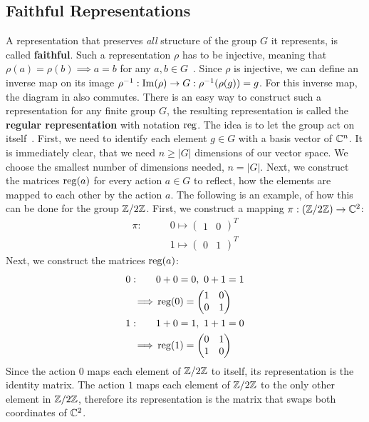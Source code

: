 \subsection{Faithful Representations}
\label{sec:basics.rep.faith}

A representation that preserves \textit{all} structure of the group $G$ it represents, is called \textbf{faithful}.
Such a representation $\rho$ has to be injective, meaning that $\rho(a) = \rho(b) \implies a = b$ for any $a, b \in G$~\cite{hein2013}.
Since $\rho$ is injective, we can define an inverse map on its image $\rho^{-1}: \operatorname{Im}(\rho) \to G: \rho^{-1}(\rho(g)) = g$.
For this inverse map, the diagram in  also commutes.
There is an easy way to construct such a representation for any finite group $G$, the resulting representation is called the \textbf{regular representation} with notation $\operatorname{reg}$.
The idea is to let the group act on itself~\cite{fulton2013}.
First, we need to identify each element $g \in G$ with a basis vector of $\mathbb{C}^n$.
It is immediately clear, that we need $n \geq |G|$ dimensions of our vector space.
We choose the smallest number of dimensions needed, $n = |G|$.
Next, we construct the matrices $\operatorname{reg}(a)$ for every action $a \in G$ to reflect, how the elements are mapped to each other by the action $a$.
The following is an example, of how this can be done for the group $\mathbb{Z}/2\mathbb{Z}$.
First, we construct a mapping $\pi: (\mathbb{Z}/2\mathbb{Z}) \to \mathbb{C}^2$:
\begin{align*}
    \pi: \qquad & 0 \mapsto \begin{pmatrix}
        1 & 0
    \end{pmatrix}^T \\
    & 1 \mapsto \begin{pmatrix}
        0 & 1
    \end{pmatrix}^T
\end{align*}
Next, we construct the matrices $\operatorname{reg}(a)$:
\begin{align*}
    0: \qquad & 0 + 0 = 0,\ 0 + 1 = 1 \\
    \implies & \operatorname{reg}(0) = \begin{pmatrix}
        1 & 0 \\
        0 & 1
    \end{pmatrix} \\
    1: \qquad & 1 + 0 = 1,\ 1 + 1 = 0 \\
    \implies & \operatorname{reg}(1) = \begin{pmatrix}
        0 & 1 \\
        1 & 0
    \end{pmatrix}
\end{align*}
Since the action $0$ maps each element of $\mathbb{Z}/2\mathbb{Z}$ to itself, its representation is the identity matrix.
The action $1$ maps each element of $\mathbb{Z}/2\mathbb{Z}$ to the only other element in $\mathbb{Z}/2\mathbb{Z}$, therefore its representation is the matrix that swaps both coordinates of $\mathbb{C}^2$.

